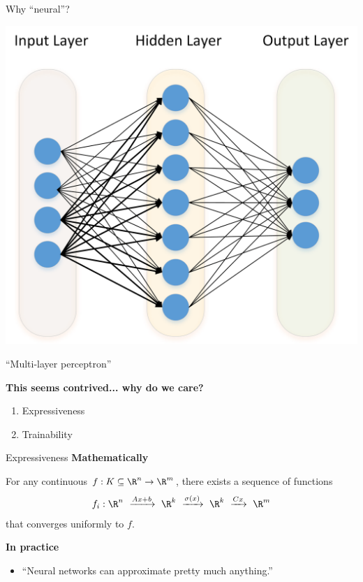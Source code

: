 \begin{frame}{Why ``neural''?}
	\begin{center}
		\includegraphics[width = .7 \textwidth]{neural-net.png}
	\end{center}

	\pause

	\begin{center}
		``Multi-layer perceptron''
	\end{center}
\end{frame}

\begin{frame}
	\begin{center}
		\textbf{This seems contrived... why do we care?}
	\end{center}

	\bigskip \pause

	\begin{center}
		\begin{enumerate}[<+->]
			\item Expressiveness
			\item Trainability
		\end{enumerate}
	\end{center}
\end{frame}

\begin{frame}{Expressiveness}
	\textbf{Mathematically}

	For any continuous $f : K \subseteq \R^n \to \R^m$, there exists a sequence of functions
	\begin{equation*}
		f_i :
		\R^n
		\ \xrightarrow{Ax + b} \ \R^k
		\ \xrightarrow{\sigma(x)} \  \R^k
		\ \xrightarrow{Cx} \ \R^m
	\end{equation*}
	that converges uniformly to $f$.

	\pause \bigskip

	\textbf{In practice}

	\begin{itemize}
		\item ``Neural networks can approximate pretty much anything.''
	\end{itemize}
\end{frame}

